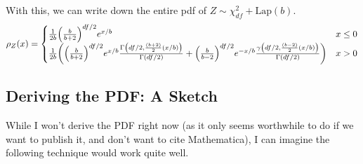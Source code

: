 \documentclass{article}
\begin{document}
With this, we can write down the entire pdf of $Z\sim \chi^2_{df} + \text{Lap}(b)$.
\begin{align*}
\rho_Z(x) = \begin{cases} \frac{1}{2b}\pqty{\frac{b}{b+2}}^{df/2}e^{x/b} & x \leq 0 \\
\frac{1}{2b}\pqty{\pqty{\frac{b}{b+2}}^{df/2}e^{x/b}\frac{\Gamma\pqty{df/2,\frac{(b+2)}{2}(x/b)}}{\Gamma(df/2)} + \pqty{\frac{b}{b-2}}^{df/2}e^{-x/b}\frac{\gamma\pqty{df/2,\frac{(b-2)}{2}(x/b)}}{\Gamma(df/2)}} & x > 0
\end{cases}
\end{align*}
\subsection{Deriving the PDF: A Sketch}
While I won't derive the PDF right now (as it only seems worthwhile to do if we want to publish it, and don't want to cite Mathematica), I can imagine the following technique would work quite well.
\end{document}
